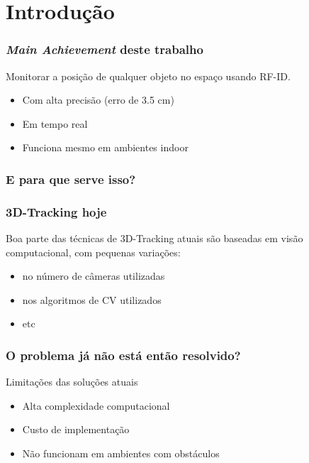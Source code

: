\section{Introdução}

\begin{frame}
  \frametitle{\emph{Main Achievement} deste trabalho}

    Monitorar a posição de qualquer objeto no espaço usando RF-ID.

    \begin{itemize}
      \item Com \alert{alta precisão} (erro de 3.5 cm)
      \item Em \alert{tempo real}
      \item Funciona mesmo em ambientes \alert{indoor}
    \end{itemize}
\end{frame}

\begin{frame}
  \frametitle{E para que serve isso?}

  

\end{frame}

\begin{frame}
  \frametitle{3D-Tracking hoje}

  Boa parte das técnicas de 3D-Tracking atuais são baseadas em visão computacional, com pequenas variações:
  \begin{itemize}
    \item no número de câmeras utilizadas
    \item nos algoritmos de CV utilizados
    \item etc
  \end{itemize}
\end{frame}

\begin{frame}
  \frametitle{O problema já não está então resolvido?}

  Limitações das soluções atuais
  \begin{itemize}
    \item  Alta complexidade computacional
    \item  Custo de implementação
    \item  Não funcionam em ambientes com obstáculos
  \end{itemize}

\end{frame}


